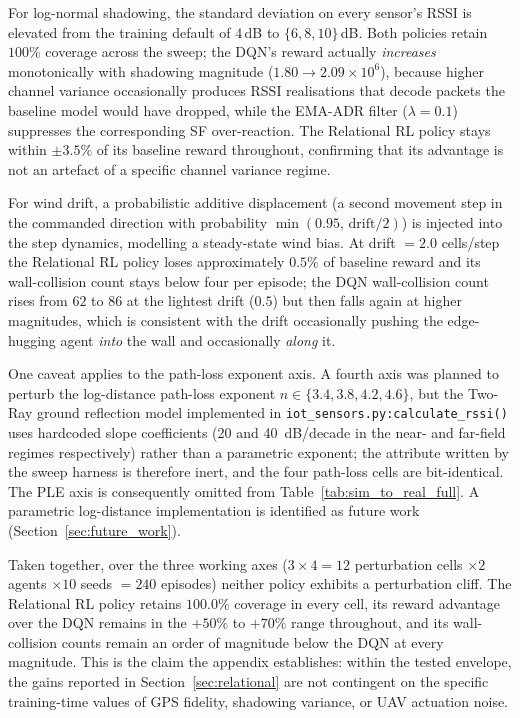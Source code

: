 For log-normal shadowing, the standard deviation on every sensor's RSSI is elevated
from the training default of $4$\,dB to $\{6, 8, 10\}$\,dB. Both
policies retain $100\%$ coverage across the sweep; the DQN's reward
actually \emph{increases} monotonically with shadowing magnitude
($1.80 \to 2.09 \times 10^6$), because higher channel variance
occasionally produces RSSI realisations that decode packets the
baseline model would have dropped, while the EMA-ADR filter ($\lambda=0.1$) suppresses the corresponding
SF over-reaction.
The Relational RL policy stays within $\pm 3.5\%$ of its baseline
reward throughout, confirming that its advantage is not an artefact
of a specific channel variance regime.

For wind drift, a probabilistic additive displacement (a second movement step in the
commanded direction with probability $\min(0.95,\, \text{drift}/2)$)
is injected into the step dynamics, modelling a steady-state wind
bias. At drift $= 2.0$ cells/step the Relational RL policy loses
approximately $0.5\%$ of baseline reward and its wall-collision count
stays below four per episode; the DQN wall-collision count rises from
$62$ to $86$ at the lightest drift ($0.5$) but then falls again at
higher magnitudes, which is consistent with the drift occasionally
pushing the edge-hugging agent \emph{into} the wall and occasionally
\emph{along} it.

One caveat applies to the path-loss exponent axis. A fourth axis was planned to perturb the log-distance path-loss
exponent $n \in \{3.4, 3.8, 4.2, 4.6\}$, but the Two-Ray ground
reflection model implemented in
\texttt{iot\_sensors.py:\allowbreak calculate\_rssi()}
uses hardcoded slope coefficients (20 and 40~dB/decade in the
near- and far-field regimes respectively) rather than a parametric
exponent; the attribute written by the sweep harness is therefore
inert, and the four path-loss cells are bit-identical. The PLE axis
is consequently omitted from Table~\ref{tab:sim_to_real_full}. A
parametric log-distance implementation is identified as future work
(Section~\ref{sec:future_work}).

Taken together, over the three working axes ($3 \times 4 = 12$ perturbation cells
$\times 2$ agents $\times 10$ seeds $= 240$ episodes) neither policy
exhibits a perturbation cliff. The Relational RL policy retains
$100.0\%$ coverage in every cell, its reward advantage over the DQN
remains in the $+50\%$ to $+70\%$ range throughout, and its wall-
collision counts remain an order of magnitude below the DQN at every
magnitude. This is the claim the appendix establishes: within the
tested envelope, the gains reported in Section~\ref{sec:relational}
are not contingent on the specific training-time values of GPS
fidelity, shadowing variance, or UAV actuation noise.
